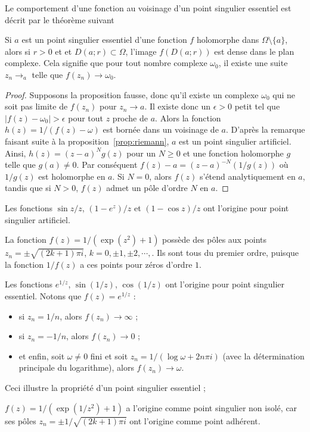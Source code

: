 Le comportement d'une fonction au voisinage d'un point singulier essentiel est décrit par le théorème suivant
\begin{theorem}
Si $a$ est un point singulier essentiel d'une fonction $f$ holomorphe dans $\Omega \setminus\{a\}$, alors si $r>0$ et et $D(a;r) \subset \Omega$, l'image $f(D(a;r))$ est dense dans le plan complexe. Cela signifie que pour tout nombre complexe $\omega_0$, il existe une suite $z_n  \to_a$ telle que $f(z_n) \to \omega_0$.
\end{theorem}
\begin{proof}
Supposons la proposition fausse, donc qu'il existe un complexe $\omega_0$ qui ne soit pas limite de $f(z_n)$ pour $z_n \to a$. Il existe donc un $\epsilon>0$ petit tel que $\lvert f(z)-\omega_0 \rvert > \epsilon$ pour tout $z$ proche de $a$. Alors la fonction $h(z)=1/(f(z)-\omega)$ est bornée dans un voisinage de $a$. D'après la remarque faisant suite à la proposition~\ref{prop:riemann}, $a$ est un point singulier artificiel. Ainsi, $h(z)=(z-a)^N g(z)$ pour un $N \geq 0$ et une fonction holomorphe $g$ telle que $g(a) \neq 0$. Par conséquent $f(z)-a=(z-a)^{-N}(1/g(z))$ où $1/g(z)$ est holomorphe en $a$. Si $N=0$, alors $f(z)$ s'étend analytiquement en $a$, tandis que si $N>0$, $f(z)$ admet un pôle d'ordre $N$ en $a$.
\end{proof}

\begin{exem}
\begin{MYenumerate}
\item Les fonctions $\sin z/z$, $(1-e^z)/z$ et $(1-\cos z)/z$ ont l'origine pour point singulier artificiel.
\item La fonction $f(z)=1/(\exp(z^2) +1)$ possède des pôles aux points $z_n = \pm \sqrt{(2k+1) \pi i}$, $k=0, \pm 1, \pm 2, \cdots,$. Ils sont tous du premier ordre, puisque la fonction $1/f(z)$ a ces points pour zéros d'ordre $1$.
\item Les fonctions $e^{1/z}$, $\sin(1/z)$, $\cos(1/z)$ ont l'origine pour point singulier essentiel. Notons que $f(z)=e^{1/z}$ :
\begin{itemize}
\item si $z_n=1/n$, alors $f(z_n) \to \infty$ ;
\item si $z_n=-1/n$, alors $f(z_n) \to 0$ ;
\item et enfin, soit $\omega \neq 0$ fini et soit $z_n=1/(\log \omega + 2 n \pi i)$ (avec la détermination principale du logarithme), alors $f(z_n) \to \omega$.
\end{itemize}
Ceci illustre la propriété d'un point singulier essentiel ;
\item $f(z)=1/(\exp(1/z^2) + 1)$ a l'origine comme point singulier non isolé, car ses pôles $z_n = \pm 1/\sqrt{(2k+1) \pi i}$ ont l'origine comme point adhérent.
\end{MYenumerate}
\end{exem}

